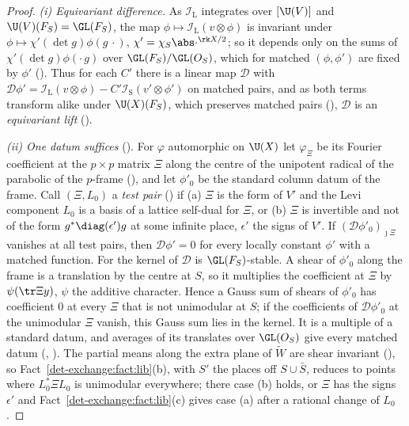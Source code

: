 \begin{proof}
\emph{(i) Equivariant difference.} As $\mathcal I_{\mathrm L}$ integrates over $[\U(V)]$ and
$\U(V)(F_S)=\GL(F_S)$, the map $\phi\mapsto\mathcal I_{\mathrm L}(v\otimes\phi)$ is invariant under
$\phi\mapsto\chi'(\det g)\phi(g\,\cdot)$, $\chi'=\chi_S\abs\cdot^{\rk X/2}$; so it depends only on the
sums of $\chi'(\det g)\phi(\cdot\,g)$ over $\GL(F_S)/\GL(O_S)$, which for matched $(\phi,\phi')$ are fixed by
$\phi'$ (). Thus for each $C'$ there is a linear map
$\mathcal D$ with $\mathcal D\phi'=\mathcal I_{\mathrm L}(v\otimes\phi)-C'\mathcal I_{\mathrm
S}(v'\otimes\phi')$ on matched pairs, and as both terms transform alike under $\U(X)(F_S)$, which
preserves matched pairs (), $\mathcal D$ is an
\emph{equivariant lift} ().

\emph{(ii) One datum suffices} ().
For $\varphi$ automorphic on $\U(X)$ let $\varphi_\Xi$ be its Fourier coefficient at the $p\times p$
matrix $\Xi$ along the centre of the unipotent radical of the parabolic of the $p$-frame
(), and let $\phi'_0$ be the standard column datum of the
frame. Call $(\Xi,L_0)$ a \emph{test pair} () if (a) $\Xi$ is
the form of $V'$ and the Levi component $L_0$ is a basis of a lattice self-dual for $\Xi$, or (b)
$\Xi$ is invertible and not of the form $g^*\diag(\epsilon')g$ at some infinite place, $\epsilon'$
the signs of $V'$. If $(\mathcal D\phi'_0)_{\jmath\Xi}$ vanishes at all test pairs, then $\mathcal
D\phi'=0$ for every locally constant $\phi'$ with a matched function. For the kernel of $\mathcal D$
is $\GL(F_S)$-stable. A shear of $\phi'_0$ along the frame is a translation by the centre at $S$, so
it multiplies the coefficient at $\Xi$ by $\psi(\tr\Xi y)$, $\psi$ the additive character. Hence a Gauss sum of shears of $\phi'_0$
has coefficient $0$ at every $\Xi$ that is not unimodular at $S$; if the coefficients of $\mathcal
D\phi'_0$ at the unimodular $\Xi$ vanish, this Gauss sum lies in the kernel. It is a multiple of a
standard datum, and averages of its translates over $\GL(O_S)$ give every matched datum
(,
). The partial means along the extra plane of $\widetilde W$ are
shear invariant (), so
Fact~\ref{det-exchange:fact:lib}(b), with $S'$ the places off $S\cup\bar S$, reduces to points where
$L_0^*\Xi L_0$ is unimodular everywhere; there case (b) holds, or $\Xi$ has the signs $\epsilon'$ and
Fact~\ref{det-exchange:fact:lib}(c) gives case (a) after a rational change of $L_0$.


\end{proof}
